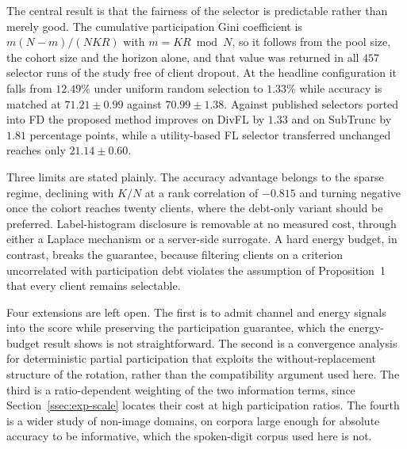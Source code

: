 \documentclass[journal]{IEEEtran}
\newcommand{\new}[1]{#1}
\newcommand{\rev}[1]{#1}
\begin{document}
\rev{The central result is that the fairness of the selector is predictable rather than merely good. The cumulative participation Gini coefficient is $m(N-m)/(NKR)$ with $m = KR \bmod N$, so it follows from the pool size, the cohort size and the horizon alone, and that value was returned in all $457$ selector runs of the study free of client dropout. At the headline configuration it falls from $12.49\%$ under uniform random selection to $1.33\%$ while accuracy is matched at $71.21 \pm 0.99$ against $70.99 \pm 1.38$. Against published selectors ported into FD the proposed method improves on DivFL by $1.33$ and on SubTrunc by $1.81$ percentage points, while a utility-based FL selector transferred unchanged reaches only $21.14 \pm 0.60$.}

\rev{Three limits are stated plainly. The accuracy advantage belongs to the sparse regime, declining with $K/N$ at a rank correlation of $-0.815$ and turning negative once the cohort reaches twenty clients, where the debt-only variant should be preferred. Label-histogram disclosure is removable at no measured cost, through either a Laplace mechanism or a server-side surrogate. A hard energy budget, in contrast, breaks the guarantee, because filtering clients on a criterion uncorrelated with participation debt violates the assumption of Proposition~1 that every client remains selectable.}

\new{Four extensions are left open. The first is to admit channel and energy signals into the score while preserving the participation guarantee, which the energy-budget result shows is not straightforward. \rev{The second is a convergence analysis for deterministic partial participation that exploits the without-replacement structure of the rotation, rather than the compatibility argument used here.} The third is a ratio-dependent weighting of the two information terms, since Section~\ref{ssec:exp-scale} locates their cost at high participation ratios. \rev{The fourth is a wider study of non-image domains, on corpora large enough for absolute accuracy to be informative, which the spoken-digit corpus used here is not.}}
\balance

{\setlength{\itemsep}{0pt plus 0.2ex}\setlength{\parsep}{0pt}
}
\end{document}
